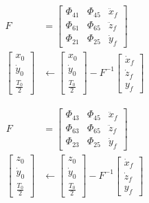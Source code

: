\documentclass[conf]{new-aiaa}
\begin{document}
\begin{multicols}{2}
\begin{equation}
    \begin{aligned}
        F &= \begin{bmatrix} \Phi_{41} & \Phi_{45} & \ddot{x}_f \\
                             \Phi_{61} & \Phi_{65} & \ddot{z}_f \\
                             \Phi_{21} & \Phi_{25} & \dot{y}_f \end{bmatrix} \\
        \begin{bmatrix} x_0 \\ \dot{y}_0 \\ \frac{T_0}{2} \end{bmatrix} & \leftarrow 
        \begin{bmatrix} x_0 \\ \dot{y}_0 \\ \frac{T_0}{2} \end{bmatrix} - F^{-1} 
        \begin{bmatrix} \dot{x}_f \\ \dot{z}_f \\ y_f \end{bmatrix}
    \end{aligned}
\end{equation}

\begin{equation}
    \begin{aligned}
        F &= \begin{bmatrix} \Phi_{43} & \Phi_{45} & \ddot{x}_f \\
                             \Phi_{63} & \Phi_{65} & \ddot{z}_f \\
                             \Phi_{23} & \Phi_{25} & \dot{y}_f \end{bmatrix} \\
        \begin{bmatrix} z_0 \\ \dot{y}_0 \\ \frac{T_0}{2} \end{bmatrix} & \leftarrow 
        \begin{bmatrix}z_0 \\ \dot{y}_0 \\ \frac{T_0}{2} \end{bmatrix} - F^{-1} 
        \begin{bmatrix} \dot{x}_f \\ \dot{z}_f \\ y_f \end{bmatrix}
    \end{aligned}
\end{equation}


\end{multicols}
\end{document}

